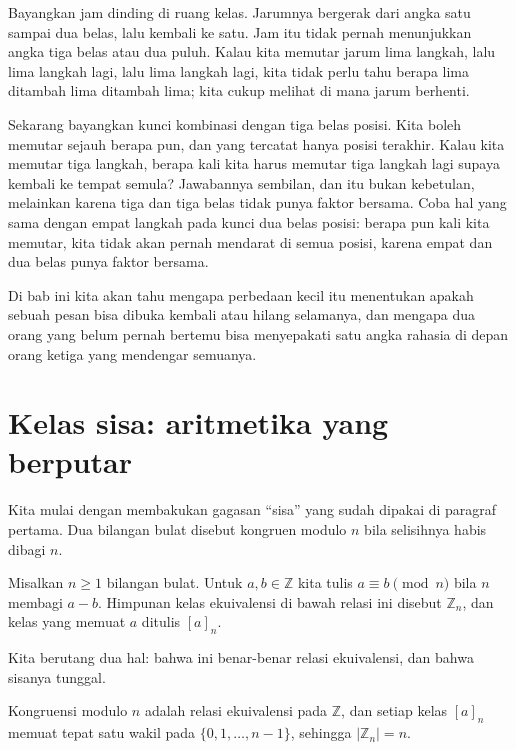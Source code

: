 \begin{untukanak}
Bayangkan jam dinding di ruang kelas. Jarumnya bergerak dari angka satu sampai dua belas, lalu
kembali ke satu. Jam itu tidak pernah menunjukkan angka tiga belas atau dua puluh. Kalau kita
memutar jarum lima langkah, lalu lima langkah lagi, lalu lima langkah lagi, kita tidak perlu
tahu berapa lima ditambah lima ditambah lima; kita cukup melihat di mana jarum berhenti.

Sekarang bayangkan kunci kombinasi dengan tiga belas posisi. Kita boleh memutar sejauh berapa
pun, dan yang tercatat hanya posisi terakhir. Kalau kita memutar tiga langkah, berapa kali
kita harus memutar tiga langkah lagi supaya kembali ke tempat semula? Jawabannya sembilan, dan
itu bukan kebetulan, melainkan karena tiga dan tiga belas tidak punya faktor bersama. Coba hal
yang sama dengan empat langkah pada kunci dua belas posisi: berapa pun kali kita memutar, kita
tidak akan pernah mendarat di semua posisi, karena empat dan dua belas punya faktor bersama.

Di bab ini kita akan tahu mengapa perbedaan kecil itu menentukan apakah sebuah pesan bisa
dibuka kembali atau hilang selamanya, dan mengapa dua orang yang belum pernah bertemu bisa
menyepakati satu angka rahasia di depan orang ketiga yang mendengar semuanya.
\end{untukanak}

\section{Kelas sisa: aritmetika yang berputar}

Kita mulai dengan membakukan gagasan ``sisa'' yang sudah dipakai di paragraf pertama.
Dua bilangan bulat disebut kongruen modulo $n$ bila selisihnya habis dibagi $n$.

\begin{definisi}
Misalkan $n\ge1$ bilangan bulat. Untuk $a,b\in\mathbb{Z}$ kita tulis $a\equiv b\pmod{n}$
bila $n$ membagi $a-b$. Himpunan kelas ekuivalensi di bawah relasi ini disebut
$\mathbb{Z}_n$, dan kelas yang memuat $a$ ditulis $[a]_n$.
\end{definisi}

Kita berutang dua hal: bahwa ini benar-benar relasi ekuivalensi, dan bahwa sisanya tunggal.

\begin{lemma}
Kongruensi modulo $n$ adalah relasi ekuivalensi pada $\mathbb{Z}$, dan setiap kelas
$[a]_n$ memuat tepat satu wakil pada $\{0,1,\dots,n-1\}$, sehingga $|\mathbb{Z}_n|=n$.
\end{lemma}

